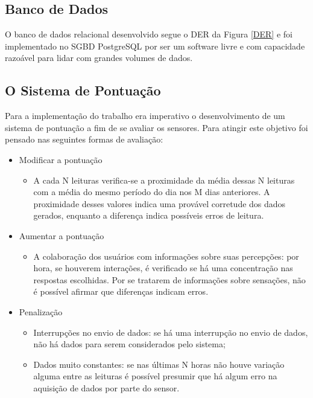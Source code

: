 \subsection{Banco de Dados}
\null \quad O banco de dados relacional desenvolvido segue o \acrfull{DER} da Figura \ref{DER} e foi implementado no \acrfull{SGBD} PostgreSQL por ser um software livre e com capacidade razoável para lidar com grandes volumes de dados.

\newpage
\subsection{O Sistema de Pontuação}
\label{subsec:pontuacao}
\null \quad Para a implementação do trabalho era imperativo o desenvolvimento de um sistema de pontuação a fim de se avaliar os sensores. Para atingir este objetivo foi pensado nas seguintes formas de avaliação:
\begin{itemize}
  \item Modificar a pontuação
    \begin{itemize}
      \item A cada N leituras verifica-se a proximidade da média dessas N leituras com a média do mesmo período do dia nos M dias anteriores. A proximidade desses valores indica uma provável corretude dos dados gerados, enquanto a diferença indica possíveis erros de leitura.
    \end{itemize}
  \item Aumentar a pontuação
  \begin{itemize}
    \item A colaboração dos usuários com informações sobre suas percepções: por hora, se houverem interações, é verificado se há uma concentração nas respostas escolhidas. Por se tratarem de informações sobre sensações, não é possível afirmar que diferenças indicam erros.
  \end{itemize}
  \item Penalização
    \begin{itemize}
      \item Interrupções no envio de dados: se há uma interrupção no envio de dados, não há dados para serem considerados pelo sistema;
      \item Dados muito constantes: se nas últimas N horas não houve variação alguma entre as leituras é possível presumir que há algum erro na aquisição de dados por parte do sensor.
    \end{itemize}
\end{itemize}

